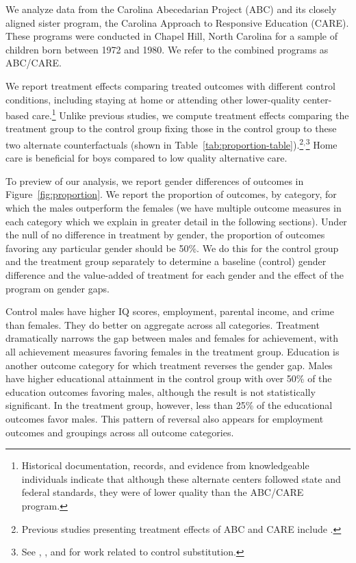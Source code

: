 We analyze data from the Carolina Abecedarian Project (ABC) and its closely aligned sister program, the Carolina Approach to Responsive Education (CARE). These programs were conducted in Chapel Hill, North Carolina for a sample of children born between 1972 and 1980. We refer to the combined programs as ABC/CARE.

We report treatment effects comparing treated outcomes with different control conditions, including staying at home or attending other lower-quality center-based care.\footnote{Historical documentation, records, and evidence from knowledgeable individuals indicate that although these alternate centers followed state and federal standards, they were of lower quality than the ABC/CARE program.} Unlike previous studies, we compute treatment effects comparing the treatment group to the control group fixing those in the control group to these two alternate counterfactuals (shown in Table~\ref{tab:proportion-table}).\footnote{Previous studies presenting treatment effects of ABC and CARE include \citet{Ramey_etal_1985_Project-CARE_TiECSE, Clarke_Campbell_1998_ABC_Comparison_ECRQ,Campbell_Pungello_etal_2001_DP,Campbell_Ramey_etal_2002_ADS,Campbell_Wasik_etal_2008_ECRQ,Campbell_Conti_etal_2014_EarlyChildhoodInvestments}.}$^,$\footnote{See \cite{Heckman_1992_randomization}, \cite{Heckman_Hohmann_etal_2000_QJE}, and \cite{Kline_Walters_2016_QJE} for work related to control substitution.} Home care is beneficial for boys compared to low quality alternative care.

To preview of our analysis, we report gender differences of outcomes in Figure~\ref{fig:proportion}. We report the proportion of outcomes, by category, for which the males outperform the females (we have multiple outcome measures in each category which we explain in greater detail in the following sections). Under the null of no difference in treatment by gender, the proportion of outcomes favoring any particular gender should be 50\%. We do this for the control group and the treatment group separately to determine a baseline (control) gender difference and the value-added of treatment for each gender and the effect of the program on gender gaps.

Control males have higher IQ scores, employment, parental income, and crime than females. They do better on aggregate across all categories. Treatment dramatically narrows the gap between males and females for achievement, with all achievement measures favoring females in the treatment group. Education is another outcome category for which treatment reverses the gender gap. Males have higher educational attainment in the control group with over 50\% of the education outcomes favoring males, although the result is not statistically significant. In the treatment group, however, less than 25\% of the educational outcomes favor males. This pattern of reversal also appears for employment outcomes and groupings across all outcome categories.

